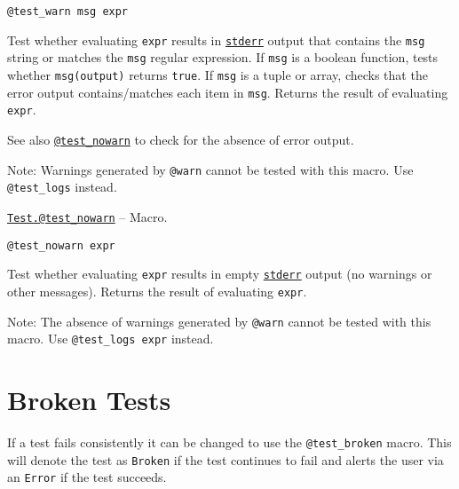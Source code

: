 \begin{adjustwidth}{2em}{0pt}


\begin{verbatim}
@test_warn msg expr
\end{verbatim}

Test whether evaluating \texttt{expr} results in \hyperlink{6150355911915549172}{\texttt{stderr}} output that contains the \texttt{msg} string or matches the \texttt{msg} regular expression.  If \texttt{msg} is a boolean function, tests whether \texttt{msg(output)} returns \texttt{true}.  If \texttt{msg} is a tuple or array, checks that the error output contains/matches each item in \texttt{msg}. Returns the result of evaluating \texttt{expr}.

See also \hyperlink{14168562674427079535}{\texttt{@test\_nowarn}} to check for the absence of error output.

Note: Warnings generated by \texttt{@warn} cannot be tested with this macro. Use \texttt{@test\_logs} instead.



\end{adjustwidth}
\hypertarget{14168562674427079535}{} 
\hyperlink{14168562674427079535}{\texttt{Test.@test\_nowarn}}  -- {Macro.}

\begin{adjustwidth}{2em}{0pt}


\begin{verbatim}
@test_nowarn expr
\end{verbatim}

Test whether evaluating \texttt{expr} results in empty \hyperlink{6150355911915549172}{\texttt{stderr}} output (no warnings or other messages).  Returns the result of evaluating \texttt{expr}.

Note: The absence of warnings generated by \texttt{@warn} cannot be tested with this macro. Use \texttt{@test\_logs expr} instead.



\end{adjustwidth}

\hypertarget{5668454159546922035}{}


\section{Broken Tests}



If a test fails consistently it can be changed to use the \texttt{@test\_broken} macro. This will denote the test as \texttt{Broken} if the test continues to fail and alerts the user via an \texttt{Error} if the test succeeds.


